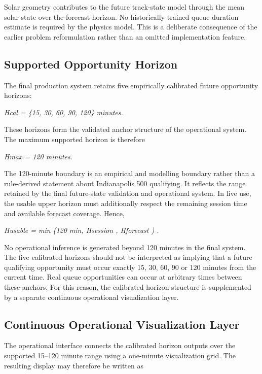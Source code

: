 Solar geometry contributes to the future track-state model through the mean solar state over the forecast horizon. No historically trained queue-duration estimate is required by the physics model. This is a deliberate consequence of the earlier problem reformulation rather than an omitted implementation feature.

\subsection{Supported Opportunity Horizon}
The final production system retains five empirically calibrated future opportunity horizons:

\begin{center}\textit{Hcal = \{15, 30, 60, 90, 120\} minutes.}\end{center}

These horizons form the validated anchor structure of the operational system. The maximum supported horizon is therefore

\begin{center}\textit{Hmax = 120 minutes.}\end{center}

The 120-minute boundary is an empirical and modelling boundary rather than a rule-derived statement about Indianapolis 500 qualifying. It reflects the range retained by the final future-state validation and operational system. In live use, the usable upper horizon must additionally respect the remaining session time and available forecast coverage. Hence,

\begin{center}\textit{Husable = min (120 min, Hsession , Hforecast ) .}\end{center}

No operational inference is generated beyond 120 minutes in the final system. The five calibrated horizons should not be interpreted as implying that a future qualifying opportunity must occur exactly 15, 30, 60, 90 or 120 minutes from the current time. Real queue opportunities can occur at arbitrary times between these anchors. For this reason, the calibrated horizon structure is supplemented by a separate continuous operational visualization layer.

\subsection{Continuous Operational Visualization Layer}
The operational interface connects the calibrated horizon outputs over the supported 15--120 minute range using a one-minute visualization grid. The resulting display may therefore be written as


